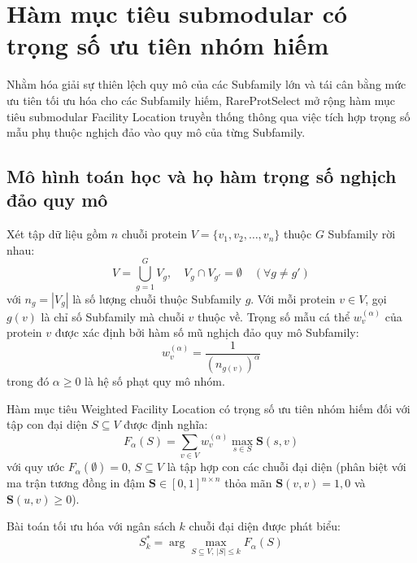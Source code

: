 \section{Hàm mục tiêu submodular có trọng số ưu tiên nhóm hiếm}
\label{sec:methodology_weighted_submodular}

Nhằm hóa giải sự thiên lệch quy mô của các Subfamily lớn và tái cân bằng mức ưu tiên tối ưu hóa cho các Subfamily hiếm, RareProtSelect mở rộng hàm mục tiêu submodular Facility Location truyền thống thông qua việc tích hợp trọng số mẫu phụ thuộc nghịch đảo vào quy mô của từng Subfamily.

\subsection{Mô hình toán học và họ hàm trọng số nghịch đảo quy mô}
\label{subsec:weighted_formulation}

Xét tập dữ liệu gồm $n$ chuỗi protein $V = \{v_1, v_2, \dots, v_n\}$ thuộc $G$ Subfamily rời nhau:
\begin{equation}
\label{eq:subfamily_partition}
V = \bigcup_{g=1}^G V_g, \quad V_g \cap V_{g'} = \emptyset \quad (\forall g \neq g')
\end{equation}
với $n_g = |V_g|$ là số lượng chuỗi thuộc Subfamily $g$. Với mỗi protein $v \in V$, gọi $g(v)$ là chỉ số Subfamily mà chuỗi $v$ thuộc về. Trọng số mẫu cá thể $w_v^{(\alpha)}$ của protein $v$ được xác định bởi hàm số mũ nghịch đảo quy mô Subfamily:
\begin{equation}
\label{eq:sample_weight_formula}
w_v^{(\alpha)} = \frac{1}{(n_{g(v)})^\alpha}
\end{equation}
trong đó $\alpha \ge 0$ là hệ số phạt quy mô nhóm.

Hàm mục tiêu Weighted Facility Location có trọng số ưu tiên nhóm hiếm đối với tập con đại diện $S \subseteq V$ được định nghĩa:
\begin{equation}
\label{eq:weighted_facility_location}
F_\alpha(S) = \sum_{v \in V} w_v^{(\alpha)} \max_{s \in S} \mathbf{S}(s, v)
\end{equation}
với quy ước $F_\alpha(\emptyset) = 0$, $S \subseteq V$ là tập hợp con các chuỗi đại diện (phân biệt với ma trận tương đồng in đậm $\mathbf{S} \in [0, 1]^{n \times n}$ thỏa mãn $\mathbf{S}(v, v) = 1{,}0$ và $\mathbf{S}(u, v) \ge 0$).

Bài toán tối ưu hóa với ngân sách $k$ chuỗi đại diện được phát biểu:
\begin{equation}
\label{eq:weighted_optimization_problem}
S_k^* = \arg\max_{S \subseteq V, \, |S| \le k} F_\alpha(S)
\end{equation}

